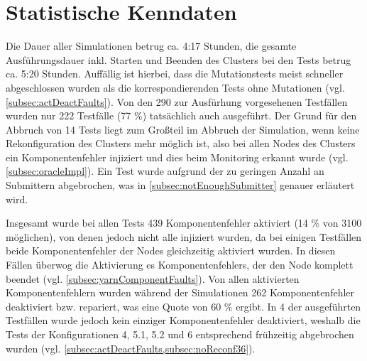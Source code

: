 \section{Statistische Kenndaten}
\label{sec:evaluationStats}

Die Dauer aller Simulationen betrug ca. 4:17 Stunden, die gesamte Ausführungsdauer inkl. Starten und Beenden des Clusters bei den Tests betrug ca. 5:20 Stunden.
Auffällig ist hierbei, dass die Mutationstests meist schneller abgeschlossen wurden als die korrespondierenden Tests ohne Mutationen (vgl. \cref{subsec:actDeactFaults}).
Von den 290 zur Ausfürhung vorgesehenen Testfällen wurden nur 222 Testfälle (77 \%) tatsächlich auch ausgeführt.
Der Grund für den Abbruch von 14 Tests liegt zum Großteil im Abbruch der Simulation, wenn keine Rekonfiguration des Clusters mehr möglich ist, also bei allen Nodes des Clusters ein Komponentenfehler injiziert und dies beim Monitoring erkannt wurde (vgl. \cref{subsec:oracleImpl}).
Ein Test wurde aufgrund der zu geringen Anzahl an Submittern abgebrochen, was in \cref{subsec:notEnoughSubmitter} genauer erläutert wird.

Insgesamt wurde bei allen Tests 439 Komponentenfehler aktiviert (14 \% von 3100 möglichen), von denen jedoch nicht alle injiziert wurden, da bei einigen Testfällen beide Komponentenfehler der Nodes gleichzeitig aktiviert wurden.
In diesen Fällen überwog die Aktivierung es Komponentenfehlers, der den Node komplett beendet (vgl.  \cref{subsec:yarnComponentFaults}).
Von allen aktivierten Komponentenfehlern wurden während der Simulationen 262 Komponentenfehler deaktiviert bzw. repariert, was eine Quote von 60 \% ergibt.
In 4 der ausgeführten Testfällen wurde jedoch kein einziger Komponentenfehler deaktiviert, weshalb die Tests der Konfigurationen 4, 5.1, 5.2 und 6 entsprechend frühzeitig abgebrochen wurden (vgl. \cref{subsec:actDeactFaults,subsec:noReconf36}).

